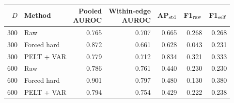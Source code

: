 \begin{tabular}{rlrrrrr}
\toprule
$D$ & Method & \shortstack{Pooled\\AUROC} & \shortstack{Within-edge\\AUROC} & AP$_{\rm std}$ & F1$_{\rm raw}$ & F1$_{\rm self}$ \\
\midrule
300 & Raw & 0.765 & 0.707 & 0.665 & 0.268 & 0.268 \\
300 & Forced hard & 0.872 & 0.661 & 0.628 & 0.043 & 0.231 \\
300 & PELT + VAR & 0.779 & 0.712 & 0.834 & 0.321 & 0.333 \\
600 & Raw & 0.786 & 0.761 & 0.440 & 0.230 & 0.230 \\
600 & Forced hard & 0.901 & 0.797 & 0.480 & 0.130 & 0.380 \\
600 & PELT + VAR & 0.794 & 0.754 & 0.429 & 0.222 & 0.238 \\
\bottomrule
\end{tabular}
